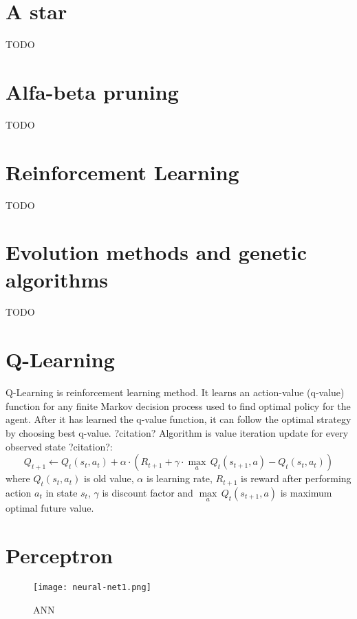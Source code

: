 \section{A star}
TODO

\section{Alfa-beta pruning}
TODO

\section{Reinforcement Learning}
TODO

\section{Evolution methods and genetic algorithms}
TODO

\section{Q-Learning}
Q-Learning is reinforcement learning method. It learns an action-value
(q-value) function for any finite Markov decision process used to find
optimal policy for the agent. After it has learned the q-value function,
it can follow the optimal strategy by choosing best q-value. ?citation?
Algorithm is value iteration update for every observed state ?citation?:
\begin{equation}
Q_{t+1} \leftarrow Q_t(s_t, a_t) + \alpha \cdot (
    R_{t+1} + \gamma\cdot {\max_a}\,Q_t(s_{t+1}, a) - Q_t(s_t, a_t)
)
\end{equation}
where $Q_t(s_t, a_t)$ is old value, $\alpha$ is learning rate, $R_{t+1}$ is
reward after performing action $a_t$ in state $s_t$, $\gamma$ is discount
factor and $\underset{a}{\max}\,Q_t(s_{t+1}, a)$ is maximum optimal future
value.

\section{Perceptron}
\begin{wrapfigure}{l}{0.4\textwidth}
  \vspace*{-0.45cm}
  \centering
  \texttt{[image: neural-net1.png]}
  \vspace*{-1.45cm}
  \caption{ANN}
  \label{fig:network}
  \vspace*{-1.00cm}
\end{wrapfigure}


